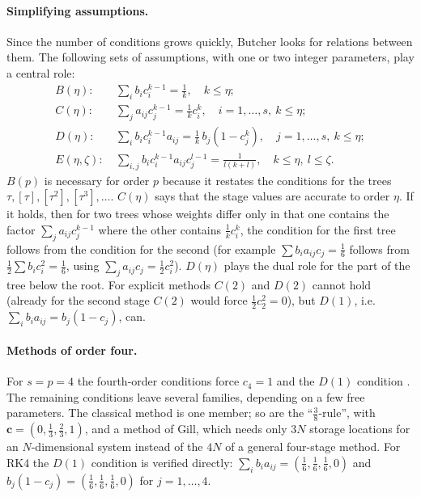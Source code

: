 \documentclass[11pt,a4paper]{article}
\begin{document}
\paragraph{Simplifying assumptions.} Since the number of conditions grows quickly, Butcher
\cite[Sect.~321]{butcher2008} looks for relations between them. The following sets of assumptions, with one or two integer parameters, play
a central role:
\begin{align*}
B(\eta):&\ \sum_i b_ic_i^{k-1}=\tfrac1k,\quad k\le\eta;\\
C(\eta):&\ \sum_j a_{ij}c_j^{k-1}=\tfrac1k c_i^{k},\quad i=1,\dots,s,\ k\le\eta;\\
D(\eta):&\ \sum_i b_ic_i^{k-1}a_{ij}=\tfrac1k\,b_j(1-c_j^{k}),\quad j=1,\dots,s,\ k\le\eta;\\
E(\eta,\zeta):&\ \sum_{i,j} b_ic_i^{k-1}a_{ij}c_j^{l-1}=\tfrac1{l(k+l)},\quad k\le\eta,\ l\le\zeta.
\end{align*}
$B(p)$ is necessary for order $p$ because it restates the conditions for the trees $\tau,[\tau],[\tau^2],[\tau^3],\dots$.
$C(\eta)$ says that the stage values are accurate to order $\eta$. If it holds, then for two trees whose weights differ only in that
one contains the factor $\sum_ja_{ij}c_j^{k-1}$ where the other contains $\tfrac1kc_i^k$, the condition for the first tree follows
from the condition for the second (for example $\sum b_ia_{ij}c_j=\tfrac16$ follows from $\tfrac12\sum b_ic_i^2=\tfrac16$, using $\sum_ja_{ij}c_j=\tfrac12c_i^2$). $D(\eta)$ plays the dual role for the part
of the tree below the root. For explicit methods $C(2)$ and $D(2)$ cannot hold (already for the second stage $C(2)$ would force
$\tfrac12c_2^2=0$), but $D(1)$, i.e.\ $\sum_ib_ia_{ij}=b_j(1-c_j)$, can.

\paragraph{Methods of order four.} For $s=p=4$ the fourth-order conditions force $c_4=1$ and the $D(1)$ condition
\cite[Sect.~322]{butcher2008}. The remaining conditions leave several families, depending on a few free parameters. The classical method is
one member; so are the ``$\tfrac38$-rule'', with $\mathbf c=(0,\tfrac13,\tfrac23,1)$, and a method of Gill, which needs only $3N$ storage locations
for an $N$-dimensional system instead of the $4N$ of a general four-stage method. For RK4 the $D(1)$ condition is verified directly:
$\sum_ib_ia_{ij}=(\tfrac16,\tfrac16,\tfrac16,0)$ and $b_j(1-c_j)=(\tfrac16,\tfrac16,\tfrac16,0)$ for $j=1,\dots,4$.
\end{document}
